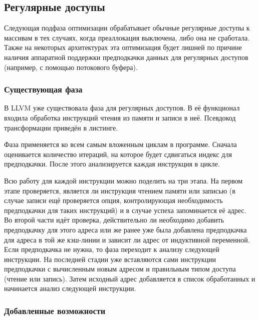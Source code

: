 \documentclass[12pt,a4paper,oneside]{article}
\begin{document}
\subsection{Регулярные доступы}

\indent

Следующая подфаза оптимизации обрабатывает обычные регулярные доступы к массивам в тех случаях, когда преаллокация выключена, либо она не сработала. Также на некоторых архитектурах эта оптимизация будет лишней по причине наличия аппаратной поддержки предподкачки данных для регулярных доступов (например, с помощью потокового буфера).

\subsubsection{Существующая фаза}

\indent

В LLVM уже существовала фаза для регулярных доступов. В её функционал входила обработка инструкций чтения из памяти и записи в неё. Псевдокод трансформации приведён в листинге.



Фаза применяется ко всем самым вложенным циклам в программе. Сначала оценивается количество итераций, на которое будет сдвигаться индекс для предподкачки. После этого анализируется каждая инструкция в цикле.

Всю работу для каждой инструкции можно поделить на три этапа. На первом этапе проверяется, является ли инструкция чтением памяти или записью (в случае записи ещё проверяется опция, контролирующая необходимость предподкачки для таких инструкций) и в случае успеха запоминается её адрес. Во второй части идёт проверка, действительно ли необходимо добавить предподкачку для этого адреса или же ранее уже была добавлена предподкачка для адреса в той же кэш-линии и зависит ли адрес от индуктивной переменной. Если предподкачка не нужна, то фаза переходит к анализу следующей инструкции. На последней стадии уже вставляются сами инструкции предподкачки с вычисленным новым адресом и правильным типом доступа (чтение или запись). Затем исходный адрес добавляется в список обработанных и начинается анализ следующей инструкции.

\subsubsection{Добавленные возможности}
\end{document}
